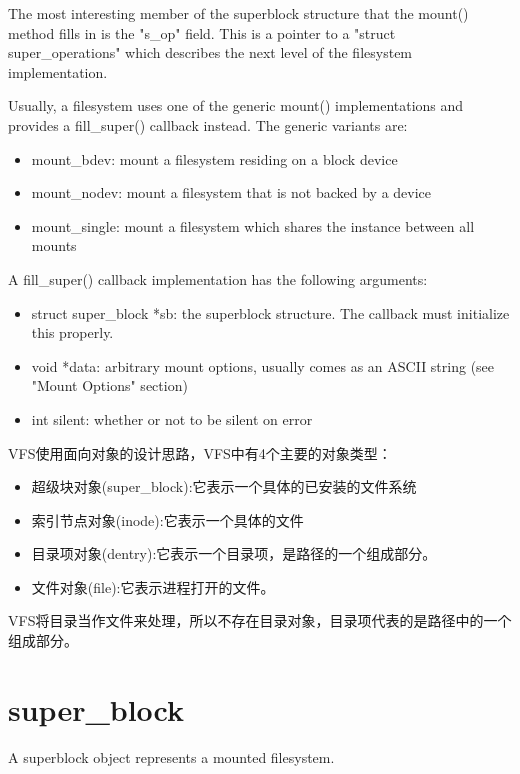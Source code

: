  The most interesting member of the superblock structure that the
 mount() method fills in is the "s\_op" field. This is a pointer to
 a "struct super\_operations" which describes the next level of the
 filesystem implementation.
 
 Usually, a filesystem uses one of the generic mount() implementations
 and provides a fill\_super() callback instead. The generic variants are:

	\begin{itemize}
	\item   mount\_bdev: mount a filesystem residing on a block device
	\item   mount\_nodev: mount a filesystem that is not backed by a device
	\item   mount\_single: mount a filesystem which shares the instance between all mounts
	\end{itemize}
 A fill\_super() callback implementation has the following arguments:
 	\begin{itemize}
   \item struct super\_block *sb: the superblock structure. The callback
         must initialize this properly.
 
    \item void *data: arbitrary mount options, usually comes as an ASCII
         string (see "Mount Options" section)
 
    \item int silent: whether or not to be silent on error
	\end{itemize}
VFS使用面向对象的设计思路，VFS中有4个主要的对象类型：

\begin{itemize}
\item 超级块对象(super\_block):它表示一个具体的已安装的文件系统
\item 索引节点对象(inode):它表示一个具体的文件
\item 目录项对象(dentry):它表示一个目录项，是路径的一个组成部分。
\item 文件对象(file):它表示进程打开的文件。
\end{itemize}

VFS将目录当作文件来处理，所以不存在目录对象，目录项代表的是路径中的一个组成部分。


\section{super\_block}

A superblock object represents a mounted filesystem.

